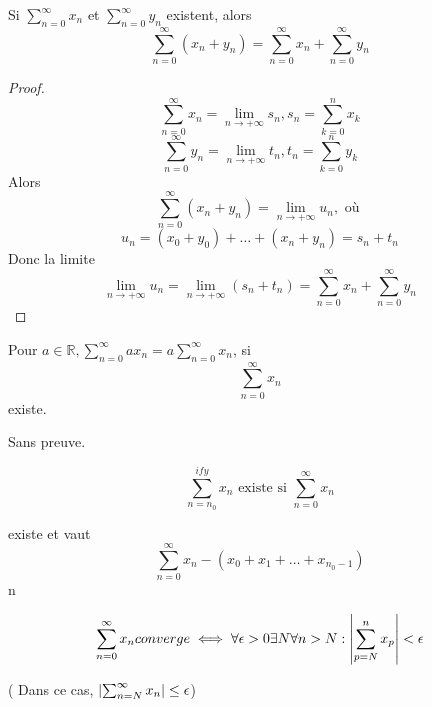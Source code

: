 \documentclass[../main.tex]{subfiles}
\begin{document}
\begin{crly}
	Si $ \sum_{n=0}^{\infty } x_n$ et $ \sum_{n=0}^{\infty } y_n$ existent, alors 
	\[ 
		\sum_{n=0}^{\infty } ( x_n + y_n) =  \sum_{n=0}^{\infty } x_n + \sum_{n=0}^{\infty } y_n
	\]
	
\end{crly}
\begin{proof}
\[ 
\sum_{n=0}^{\infty } x_n = \lim_{n \to  + \infty} s_n, s_n = \sum_{k=0}^{n}x_k
\]
\[ 
\sum_{n=0}^{\infty } y_n = \lim_{n \to  + \infty} t_n, t_n = \sum_{k=0}^{n}y_k
\]
Alors
\[ 
	\sum_{n=0}^{\infty } ( x_n + y_n) = \lim_{n \to  + \infty} u_n, \text{ où } 
\]
\[ 
	u_n = ( x_0+ y_0) + \ldots + ( x_n + y_n) = s_n + t_n
\]
Donc la limite 
\[ 
	\lim_{n \to  + \infty} u_n = \lim_{n \to  + \infty} ( s_n + t_n) = \sum_{n=0}^{\infty } x_n + \sum_{n=0}^{\infty } y_n
\]

\end{proof}
\begin{crly}
Pour $a \in \mathbb{R}, \sum_{n=0}^{\infty }a x_n = a \sum_{n=0}^{\infty } x_n$, si 
\[ 
\sum_{n=0}^{\infty} x_n
\]
existe.

Sans preuve.
\end{crly}
\begin{crly}
\[ 
\sum_{n=n_0}^{ify}x_n \text{ existe si } \sum_{n=0}^{ \infty} x_n
\]

existe et vaut 
\[ 
	\sum_{n=0}^{ \infty} x_n - (x_0+x_1+ \ldots + x_{n_0-1} )
\]
n
\end{crly}
\begin{crly}
	\[ 
		\sum_{n=0}^{ \infty} x_n converge \iff \forall \epsilon >0 \exists N \forall n > N: \left\vert \sum_{p=N}^{n}x_p\right\vert < \epsilon
	\]
	
	( Dans ce cas, $ \left\vert \sum_{n=N}^{ \infty} x_n \right\vert \leq \epsilon$)
\end{crly}
\end{document}
